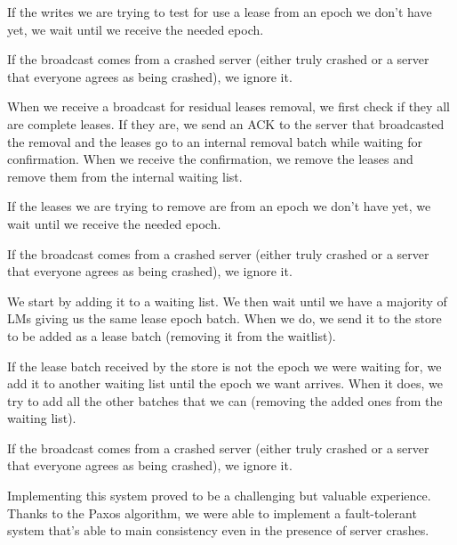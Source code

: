 \documentclass[times, 10pt,twocolumn]{article}
\begin{document}
If the writes we are trying to test for use a lease from an epoch we don’t have yet, we wait until we receive the needed epoch.

If the broadcast comes from a crashed server (either truly crashed or a server that everyone agrees as being crashed), we ignore it.


When we receive a broadcast for residual leases removal, we first check if they all are complete leases.
If they are, we send an ACK to the server that broadcasted the removal and the leases go to an internal removal batch while waiting for confirmation.
When we receive the confirmation, we remove the leases and remove them from the internal waiting list.

If the leases we are trying to remove are from an epoch we don’t have yet, we wait until we receive the needed epoch.

If the broadcast comes from a crashed server (either truly crashed or a server that everyone agrees as being crashed), we ignore it.


We start by adding it to a waiting list.
We then wait until we have a majority of LMs giving us the same lease epoch batch. When we do, we send it to the store to be added as a lease batch (removing it from the waitlist).

If the lease batch received by the store is not the epoch we were waiting for, we add it to another waiting list until the epoch we want arrives.
When it does, we try to add all the other batches that we can (removing the added ones from the waiting list).

If the broadcast comes from a crashed server (either truly crashed or a server that everyone agrees as being crashed), we ignore it.


Implementing this system proved to be a challenging but valuable experience.
Thanks to the Paxos algorithm, we were able to implement a fault-tolerant system that's able to main consistency even in the presence of server crashes.

\nocite{wikipedia}


\end{document}
